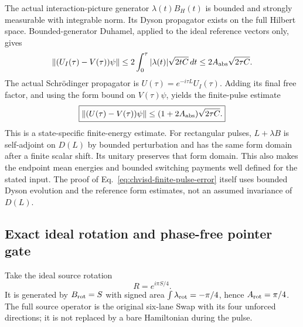 The actual interaction-picture generator $\lambda(t)B_H(t)$ is bounded
and strongly measurable with integrable norm. Its Dyson propagator exists
on the full Hilbert space. Bounded-generator Duhamel, applied to the
ideal reference vectors only, gives
\begin{equation}
 \|(U_I(\tau)-V(\tau))\psi\|
   \leq2\int_0^\tau |\lambda(t)|\sqrt{2tC}\,dt
   \leq2A_{\rm abs}\sqrt{2\tau C}.
\end{equation}
The actual Schr\"odinger propagator is
$U(\tau)=e^{-i\tau L}U_I(\tau)$. Adding its final free factor, and
using the form bound on $V(\tau)\psi$, yields the finite-pulse estimate
\begin{equation}
 \boxed{\begin{gathered}
 \|(U(\tau)-V(\tau))\psi\|
       \leq(1+2A_{\rm abs})\sqrt{2\tau C}.
 \end{gathered}}
 \label{eq:chvisd-finite-pulse-error}
\end{equation}
This is a state-specific finite-energy estimate. For rectangular pulses,
$L+\lambda B$ is self-adjoint on $D(L)$ by bounded perturbation and has
the same form domain after a finite scalar shift. Its unitary preserves
that form domain. This also makes the endpoint mean energies and bounded
switching payments well defined for the stated input. The proof of
Eq.~\eqref{eq:chvisd-finite-pulse-error} itself uses bounded Dyson evolution
and the reference form estimates, not an assumed invariance of $D(L)$.

\subsection{Exact ideal rotation and phase-free pointer gate}
\label{sec:chvisd-pointer-gate}

Take the ideal source rotation
\begin{equation}
 R=e^{i\pi S/4}.
 \label{eq:chvisd-source-quarter-rotation}
\end{equation}
It is generated by $B_{\rm rot}=S$ with signed area
$\int\lambda_{\rm rot}=-\pi/4$, hence
$A_{\rm rot}=\pi/4$. The full source operator is the original
six-lane Swap with its four unforced directions; it is not replaced by
a bare Hamiltonian during the pulse.

